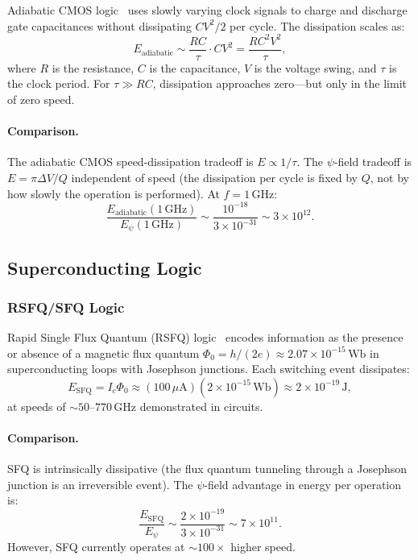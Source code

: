 \documentclass[11pt,twocolumn]{article}
\theoremstyle{definition}
\theoremstyle{remark}
\begin{document}
Adiabatic CMOS logic~\cite{Athas1994,Younis1994} uses slowly varying
clock signals to charge and discharge gate capacitances without
dissipating $CV^2/2$ per cycle. The dissipation scales as:
\begin{equation}
E_{\text{adiabatic}} \sim \frac{RC}{\tau}\cdot CV^2 = \frac{R C^2 V^2}{\tau},
\end{equation}
where $R$ is the resistance, $C$ is the capacitance, $V$ is the voltage
swing, and $\tau$ is the clock period. For $\tau \gg RC$, dissipation
approaches zero---but only in the limit of zero speed.

\paragraph{Comparison.} The adiabatic CMOS speed-dissipation tradeoff is
$E \propto 1/\tau$. The $\psi$-field tradeoff is $E = \pi\Delta V/Q$
independent of speed (the dissipation per cycle is fixed by $Q$, not by
how slowly the operation is performed). At $f = 1\,\mathrm{GHz}$:
\begin{equation}
\frac{E_{\text{adiabatic}}(1\,\mathrm{GHz})}{E_{\psi}(1\,\mathrm{GHz})} \sim \frac{10^{-18}}{3\times 10^{-31}} \sim 3\times 10^{12}.
\end{equation}

\subsection{Superconducting Logic}

\subsubsection{RSFQ/SFQ Logic}

Rapid Single Flux Quantum (RSFQ) logic~\cite{Likharev1991} encodes
information as the presence or absence of a magnetic flux quantum
$\Phi_0 = h/(2e) \approx 2.07\times 10^{-15}\,\mathrm{Wb}$ in
superconducting loops with Josephson junctions. Each switching event
dissipates:
\begin{equation}
E_{\mathrm{SFQ}} = I_c\Phi_0 \approx (100\,\mu\mathrm{A})(2\times 10^{-15}\,\mathrm{Wb})
\approx 2\times 10^{-19}\,\mathrm{J},
\end{equation}
at speeds of $\sim 50$--$770\,\mathrm{GHz}$ demonstrated in circuits.

\paragraph{Comparison.} SFQ is intrinsically dissipative (the flux
quantum tunneling through a Josephson junction is an irreversible event).
The $\psi$-field advantage in energy per operation is:
\begin{equation}
\frac{E_{\mathrm{SFQ}}}{E_\psi} \sim \frac{2\times 10^{-19}}{3\times 10^{-31}} \sim 7\times 10^{11}.
\end{equation}
However, SFQ currently operates at $\sim 100\times$ higher speed.
\end{document}
